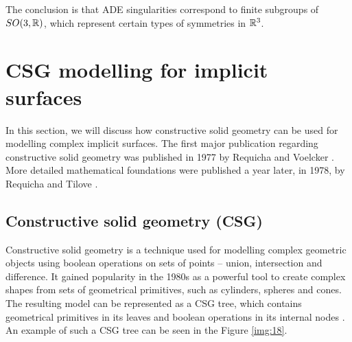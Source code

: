 The conclusion is that ADE singularities correspond to finite subgroups of
$SO(3, \mathbb{R})$, which represent certain types of symmetries in $\mathbb{R}^3$.

\section{CSG modelling for implicit surfaces}
\label{sub2.6}
In this section, we will discuss how constructive solid geometry can be used for
modelling complex implicit surfaces. The first major publication regarding constructive
solid geometry was published in 1977 by Requicha and Voelcker \cite{requicha1977constructive}.
More detailed mathematical foundations were published a year later, in 1978, by
Requicha and Tilove \cite{requicha1978mathematical}.
\subsection{Constructive solid geometry (CSG)}
Constructive solid geometry is a technique used for modelling complex geometric
objects using boolean operations on sets of points -- union, intersection and
difference. It gained popularity in the 1980s as a powerful tool to create complex
shapes from sets of geometrical primitives, such as cylinders, spheres and cones.
The resulting model can be represented as a CSG tree, which contains geometrical
primitives in its leaves and boolean operations in its internal nodes 
\cite{foley1996computer}. An example of such a CSG tree can be seen in the Figure 
\ref{img:18}.

